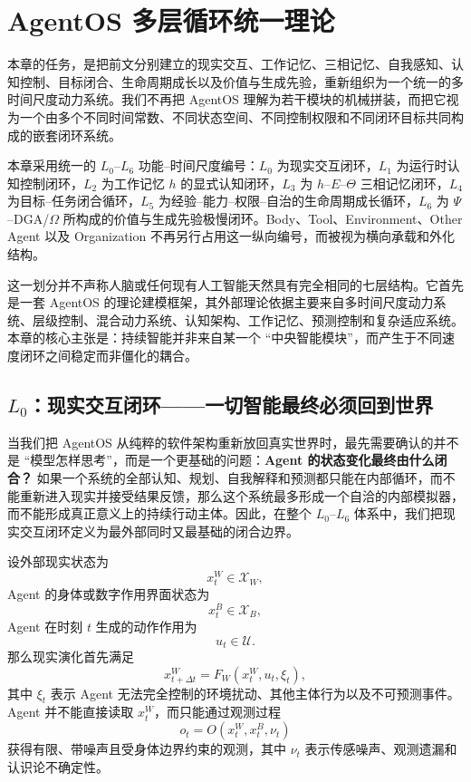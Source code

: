 \chapter{AgentOS 多层循环统一理论}
\label{chap:multiloop-unified-theory}

\begin{chapterlead}
本章的任务，是把前文分别建立的现实交互、工作记忆、三相记忆、自我感知、认知控制、目标闭合、生命周期成长以及价值与生成先验，重新组织为一个统一的多时间尺度动力系统。我们不再把 AgentOS 理解为若干模块的机械拼装，而把它视为一个由多个不同时间常数、不同状态空间、不同控制权限和不同闭环目标共同构成的嵌套闭环系统。

本章采用统一的 $L_0$--$L_6$ 功能--时间尺度编号：$L_0$ 为现实交互闭环，$L_1$ 为运行时认知控制闭环，$L_2$ 为工作记忆 $h$ 的显式认知闭环，$L_3$ 为 $h$--$E$--$\Theta$ 三相记忆闭环，$L_4$ 为目标--任务闭合循环，$L_5$ 为经验--能力--权限--自治的生命周期成长循环，$L_6$ 为 $\Psi$--DGA/$\Omega$ 所构成的价值与生成先验极慢闭环。Body、Tool、Environment、Other Agent 以及 Organization 不再另行占用这一纵向编号，而被视为横向承载和外化结构。

这一划分并不声称人脑或任何现有人工智能天然具有完全相同的七层结构。它首先是一套 AgentOS 的理论建模框架，其外部理论依据主要来自多时间尺度动力系统、层级控制、混合动力系统、认知架构、工作记忆、预测控制和复杂适应系统。本章的核心主张是：持续智能并非来自某一个 ``中央智能模块''，而产生于不同速度闭环之间稳定而非僵化的耦合。
\end{chapterlead}

\section{$L_0$：现实交互闭环——一切智能最终必须回到世界}

当我们把 AgentOS 从纯粹的软件架构重新放回真实世界时，最先需要确认的并不是 ``模型怎样思考''，而是一个更基础的问题：\textbf{Agent 的状态变化最终由什么闭合？} 如果一个系统的全部认知、规划、自我解释和预测都只能在内部循环，而不能重新进入现实并接受结果反馈，那么这个系统最多形成一个自洽的内部模拟器，而不能形成真正意义上的持续行动主体。因此，在整个 $L_0$--$L_6$ 体系中，我们把现实交互闭环定义为最外部同时又最基础的闭合边界。

设外部现实状态为
\[
x^{W}_t\in\mathcal{X}_W ,
\]
Agent 的身体或数字作用界面状态为
\[
x^{B}_t\in\mathcal{X}_B ,
\]
Agent 在时刻 $t$ 生成的动作作用为
\[
u_t\in\mathcal{U}.
\]
那么现实演化首先满足
\[
x^{W}_{t+\Delta t}
=
F_W
\left(
x^{W}_t,
u_t,
\xi_t
\right),
\]
其中 $\xi_t$ 表示 Agent 无法完全控制的环境扰动、其他主体行为以及不可预测事件。Agent 并不能直接读取 $x^W_t$，而只能通过观测过程
\[
o_t
=
O
\left(
x^W_t,
x^B_t,
\nu_t
\right)
\]
获得有限、带噪声且受身体边界约束的观测，其中 $\nu_t$ 表示传感噪声、观测遗漏和认识论不确定性。


